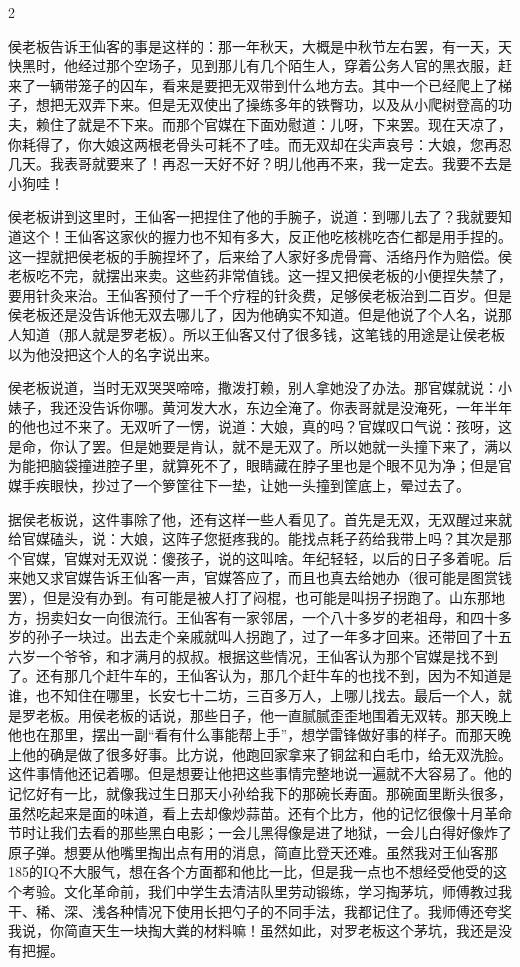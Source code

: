 2 

侯老板告诉王仙客的事是这样的：那一年秋天，大概是中秋节左右罢，有一天，天快黑时，他经过那个空场子，见到那儿有几个陌生人，穿着公务人官的黑衣服，赶来了一辆带笼子的囚车，看来是要把无双带到什么地方去。其中一个已经爬上了梯子，想把无双弄下来。但是无双使出了操练多年的铁臀功，以及从小爬树登高的功夫，赖住了就是不下来。而那个官媒在下面劝慰道：儿呀，下来罢。现在天凉了，你耗得了，你大娘这两根老骨头可耗不了哇。而无双却在尖声哀号：大娘，您再忍几天。我表哥就要来了！再忍一天好不好？明儿他再不来，我一定去。我要不去是小狗哇！ 

侯老板讲到这里时，王仙客一把捏住了他的手腕子，说道：到哪儿去了？我就要知道这个！王仙客这家伙的握力也不知有多大，反正他吃核桃吃杏仁都是用手捏的。这一捏就把侯老板的手腕捏坏了，后来给了人家好多虎骨膏、活络丹作为赔偿。侯老板吃不完，就摆出来卖。这些药非常值钱。这一捏又把侯老板的小便捏失禁了，要用针灸来治。王仙客预付了一千个疗程的针灸费，足够侯老板治到二百岁。但是侯老板还是没告诉他无双去哪儿了，因为他确实不知道。但是他说了个人名，说那人知道（那人就是罗老板）。所以王仙客又付了很多钱，这笔钱的用途是让侯老板以为他没把这个人的名字说出来。 

侯老板说道，当时无双哭哭啼啼，撒泼打赖，别人拿她没了办法。那官媒就说：小婊子，我还没告诉你哪。黄河发大水，东边全淹了。你表哥就是没淹死，一年半年的他也过不来了。无双听了一愣，说道：大娘，真的吗？官媒叹口气说：孩呀，这是命，你认了罢。但是她要是肯认，就不是无双了。所以她就一头撞下来了，满以为能把脑袋撞进腔子里，就算死不了，眼睛藏在脖子里也是个眼不见为净；但是官媒手疾眼快，抄过了一个箩筐往下一垫，让她一头撞到筐底上，晕过去了。 

据侯老板说，这件事除了他，还有这样一些人看见了。首先是无双，无双醒过来就给官媒磕头，说：大娘，这阵子您挺疼我的。能找点耗子药给我带上吗？其次是那个官媒，官媒对无双说：傻孩子，说的这叫啥。年纪轻轻，以后的日子多着呢。后来她又求官媒告诉王仙客一声，官媒答应了，而且也真去给她办（很可能是图赏钱罢），但是没有办到。有可能是被人打了闷棍，也可能是叫拐子拐跑了。山东那地方，拐卖妇女一向很流行。王仙客有一家邻居，一个八十多岁的老祖母，和四十多岁的孙子一块过。出去走个亲戚就叫人拐跑了，过了一年多才回来。还带回了十五六岁一个爷爷，和才满月的叔叔。根据这些情况，王仙客认为那个官媒是找不到了。还有那几个赶牛车的，王仙客认为，那几个赶牛车的也找不到，因为不知道是谁，也不知住在哪里，长安七十二坊，三百多万人，上哪儿找去。最后一个人，就是罗老板。用侯老板的话说，那些日子，他一直腻腻歪歪地围着无双转。那天晚上他也在那里，摆出一副“看有什么事能帮上手”，想学雷锋做好事的样子。而那天晚上他的确是做了很多好事。比方说，他跑回家拿来了铜盆和白毛巾，给无双洗脸。这件事情他还记着哪。但是想要让他把这些事情完整地说一遍就不大容易了。他的记忆好有一比，就像我过生日那天小孙给我下的那碗长寿面。那碗面里断头很多，虽然吃起来是面的味道，看上去却像炒蒜苗。还有个比方，他的记忆很像十月革命节时让我们去看的那些黑白电影；一会儿黑得像是进了地狱，一会儿白得好像炸了原子弹。想要从他嘴里掏出点有用的消息，简直比登天还难。虽然我对王仙客那185的IQ不大服气，想在各个方面都和他比一比，但是我一点也不想经受他受的这个考验。文化革命前，我们中学生去清洁队里劳动锻练，学习掏茅坑，师傅教过我干、稀、深、浅各种情况下使用长把勺子的不同手法，我都记住了。我师傅还夸奖我说，你简直天生一块掏大粪的材料嘛！虽然如此，对罗老板这个茅坑，我还是没有把握。 


